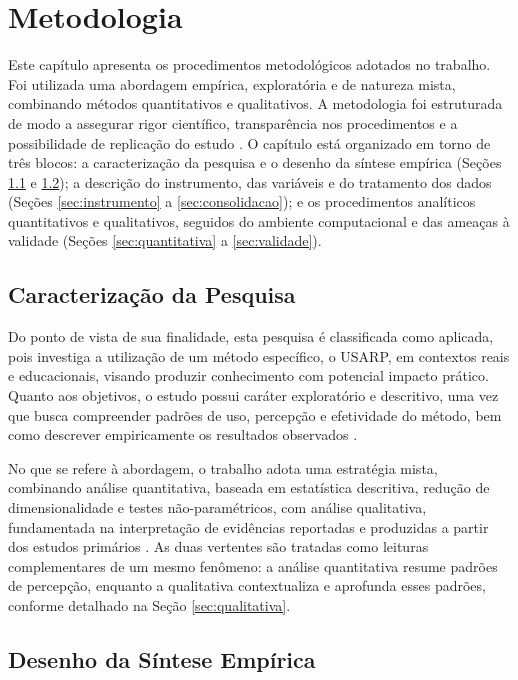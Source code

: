 \chapter{Metodologia}
\label{cap:metodologia}

Este capítulo apresenta os procedimentos metodológicos adotados no trabalho. Foi utilizada uma abordagem empírica, exploratória e de natureza mista, combinando métodos quantitativos e qualitativos. A metodologia foi estruturada de modo a assegurar rigor científico, transparência nos procedimentos e a possibilidade de replicação do estudo \cite{sommerville2011,runeson2012}. O capítulo está organizado em torno de três blocos: a caracterização da pesquisa e o desenho da síntese empírica (Seções \ref{sec:caracterizacao} e \ref{sec:desenho}); a descrição do instrumento, das variáveis e do tratamento dos dados (Seções \ref{sec:instrumento} a \ref{sec:consolidacao}); e os procedimentos analíticos quantitativos e qualitativos, seguidos do ambiente computacional e das ameaças à validade (Seções \ref{sec:quantitativa} a \ref{sec:validade}).

\section{Caracterização da Pesquisa}
\label{sec:caracterizacao}

Do ponto de vista de sua finalidade, esta pesquisa é classificada como aplicada, pois investiga a utilização de um método específico, o USARP, em contextos reais e educacionais, visando produzir conhecimento com potencial impacto prático. Quanto aos objetivos, o estudo possui caráter exploratório e descritivo, uma vez que busca compreender padrões de uso, percepção e efetividade do método, bem como descrever empiricamente os resultados observados \cite{sommerville2011,runeson2012}.

No que se refere à abordagem, o trabalho adota uma estratégia mista, combinando análise quantitativa, baseada em estatística descritiva, redução de dimensionalidade e testes não-paramétricos, com análise qualitativa, fundamentada na interpretação de evidências reportadas e produzidas a partir dos estudos primários \cite{runeson2012}. As duas vertentes são tratadas como leituras complementares de um mesmo fenômeno: a análise quantitativa resume padrões de percepção, enquanto a qualitativa contextualiza e aprofunda esses padrões, conforme detalhado na Seção \ref{sec:qualitativa}.

\section{Desenho da Síntese Empírica}
\label{sec:desenho}

